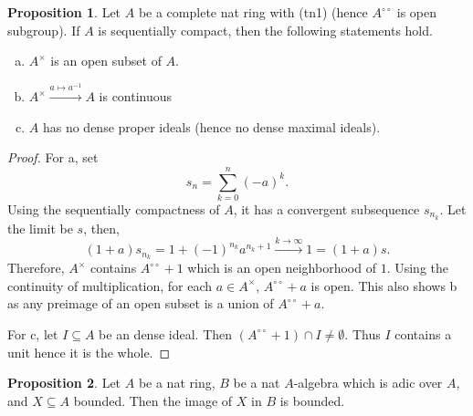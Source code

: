 \documentclass[10pt]{article}
\numberwithin{equation}{section}
\theoremstyle{definition}
\newtheorem{proposition}{Proposition}[subsection]
\newcommand{\dcirc}[0]{{\circ\circ}}
\begin{document}
\begin{proposition}
    \label{proposition_16_1}
    Let $A$ be a complete nat ring with (tn1) (hence $A^\dcirc$ is open subgroup). If $A$ is sequentially compact, then the following statements hold.
    \begin{enumerate}[a.]
        \item $A^\times$ is an open subset of $A$.
        \item $A^\times\stackrel{a\mapsto a^{-1}}{\to} A$ is continuous
        \item $A$ has no dense proper ideals (hence no dense maximal ideals).
    \end{enumerate}
\end{proposition}

\begin{proof}
    For a, set
    \begin{equation*}
        s_n = \sum_{k=0}^n (-a)^k.
    \end{equation*}
    Using the sequentially compactness of $A$, it has a convergent subsequence $s_{n_k}$. Let the limit be $s$, then,
    \begin{equation*}
        (1+a)s_{n_k} = 1+(-1)^{n_k}a^{n_k+1}\stackrel{k\to\infty}{\to}1 = (1+a)s.
    \end{equation*}
    Therefore, $A^\times$ contains $A^\dcirc+1$ which is an open neighborhood of $1$. Using the continuity of multiplication, for each $a\in A^\times$, $A^\dcirc +a$ is open. This also shows b as any preimage of an open subset is a union of $A^\dcirc+a$.
    \par For c, let $I\subseteq A$ be an dense ideal. Then $(A^{\dcirc}+1)\cap I\not=\emptyset$. Thus $I$ contains a unit hence it is the whole.
\end{proof}

\begin{proposition}
    \label{fact_17_6}
    Let $A$ be a nat ring, $B$ be a nat $A$-algebra which is adic over $A$, and $X\subseteq A$ bounded. Then the image of $X$ in $B$ is bounded.
\end{proposition}
\end{document}
